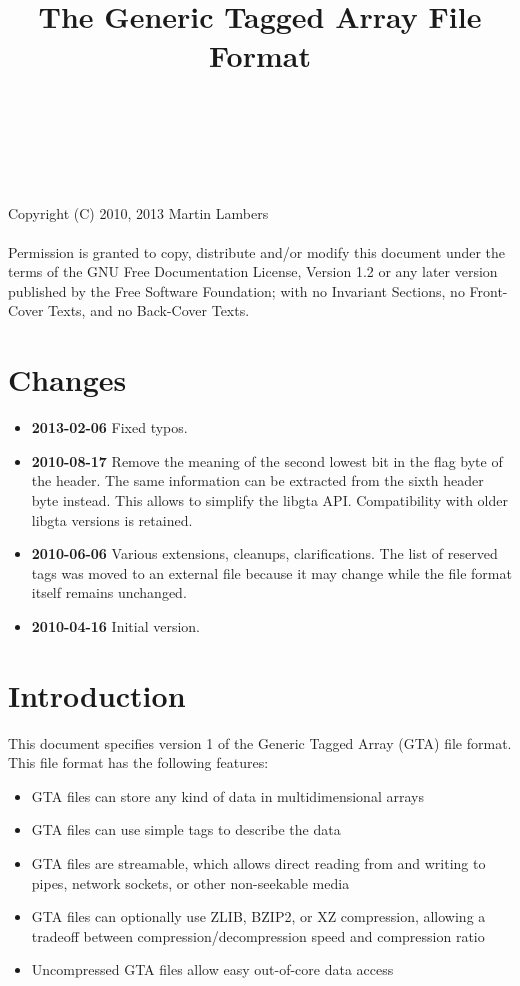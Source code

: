 \documentclass[a4paper,11pt]{article}
\begin{document}
\title{The Generic Tagged Array File Format}
\author{~}
\date{~}
\maketitle

\noindent
{\scriptsize
Copyright (C) 2010, 2013 Martin Lambers\\~\\
Permission is granted to copy, distribute and/or modify this document
under the terms of the GNU Free Documentation License, Version 1.2 or
any later version published by the Free Software Foundation; with no
Invariant Sections, no Front-Cover Texts, and no Back-Cover Texts.
}


{}
\section*{Changes}

\begin{itemize}
\item \textbf{2013-02-06} Fixed typos.
\item \textbf{2010-08-17} Remove the meaning of the second lowest bit in the
flag byte of the header. The same information can be extracted from the sixth
header byte instead. This allows to simplify the libgta API. Compatibility with
older libgta versions is retained.
\item \textbf{2010-06-06} Various extensions, cleanups, clarifications.
The list of reserved tags was moved to an external file because it may change
while the file format itself remains unchanged.
\item \textbf{2010-04-16} Initial version.
\end{itemize}


{}
\section*{Introduction}

This document specifies version 1 of the Generic Tagged Array (GTA) file format.
This file format has the following features:
\begin{itemize}
\item GTA files can store any kind of data in multidimensional arrays
\item GTA files can use simple tags to describe the data
\item GTA files are streamable, which allows direct reading from and
	writing to pipes, network sockets, or other non-seekable media
\item GTA files can optionally use ZLIB, BZIP2, or XZ compression,
	allowing a tradeoff between compression/decompression speed and
	compression ratio
\item Uncompressed GTA files allow easy out-of-core data access
\end{itemize}
\end{document}
